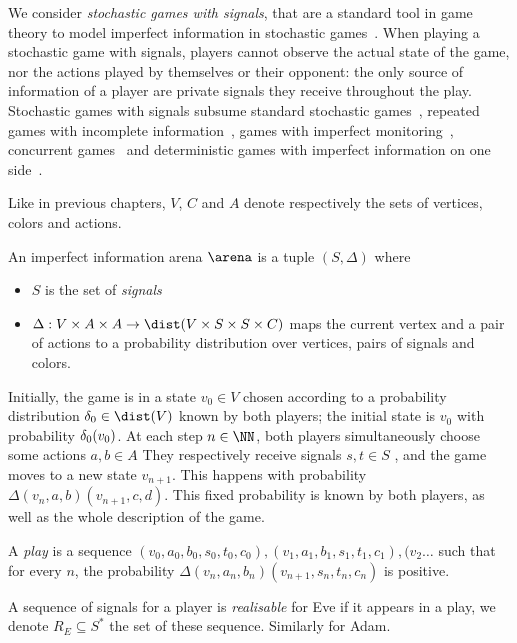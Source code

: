We consider \emph{stochastic games with signals}, that are a standard tool in game theory to model imperfect information in stochastic games~\cite{sorinafirst,dinahnicolas1,renault2}.
When playing a stochastic game with signals, players cannot observe
the actual state of the game, nor the actions played by themselves or
their opponent: the only source of information of a player are private
signals they receive throughout the play.  Stochastic games with
signals subsume standard stochastic games~\cite{shapley}, repeated
games with incomplete information~\cite{aumann}, games with imperfect
monitoring~\cite{dinahnicolas1}, concurrent games~\cite{dAH00} and
deterministic games with imperfect information on one
side~\cite{reif,chdr07}.

Like in previous chapters, $V$, $C$ and $A$  
denote respectively the sets
	of vertices, colors and actions.
\begin{definition}
An imperfect information arena $\arena$ is a tuple $(S,\Delta)$ where 
\begin{itemize}
	\item $S$ is the set of \emph{signals}
	\item $\Delta : V \times A \times A \to \dist(V \times S \times S \times C)$
	 maps the current vertex and a pair of actions to a probability distribution
	 over vertices, pairs of signals and colors.
\end{itemize}
\end{definition}

Initially, the game is in a state $v_0 \in V$ chosen according to a probability distribution
$\ini\in\dist(V)$ known by both players; the initial state is
$v_0$ with probability $\delta_0(v_0)$.  At each step $n\in\NN$, both players
simultaneously choose some actions $a,b \in A$
 They respectively receive signals
$s,t \in S$ ,
 and the game moves to a
new state $v_{n+1}$.  This happens with probability
$\Delta(v_{n},a,b)(v_{n+1},c,d)$.
{This fixed probability is known by both players,
as well as the whole description of the game.}

A \emph{play} is a sequence $(v_0,a_0,b_0,s_0,t_0,c_0),(v_1,a_1,b_1,s_1,t_1,c_1),(v_2\ldots$
such that for every $n$, the probability $\Delta(v_{n},a_n,b_n)(v_{n+1},s_n,t_n,c_n)$
is positive.

A sequence of signals for a player
is \emph{realisable} for Eve if it appears in a play,
we denote $R_E \subseteq S^*$ the set of these sequence.
Similarly for Adam.


